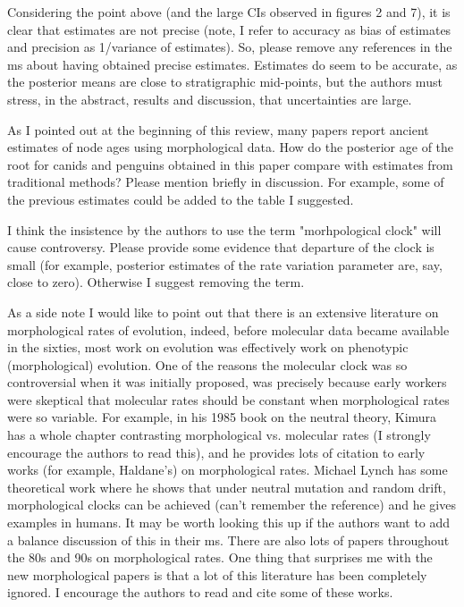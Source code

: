 \documentclass[11pt]{article}
\begin{document}
Considering the point above (and the large CIs observed in figures 2 and 7), it is clear that estimates are not precise (note, I refer to accuracy as bias of estimates and precision as 1/variance of estimates). So, please remove any references in the ms about having obtained precise estimates. Estimates do seem to be accurate, as the posterior means are close to stratigraphic mid-points, but the authors must stress, in the abstract, results and discussion, that uncertainties are large.

As I pointed out at the beginning of this review, many papers report ancient estimates of node ages using morphological data. How do the posterior age of the root for canids and penguins obtained in this paper compare with estimates from traditional methods? Please mention briefly in discussion. For example, some of the previous estimates could be added to the table I suggested.

I think the insistence by the authors to use the term "morhpological clock" will cause controversy. Please provide some evidence that departure of the clock is small (for example, posterior estimates of the rate variation parameter are, say, close to zero). Otherwise I suggest removing the term.

As a side note I would like to point out that there is an extensive literature on morphological rates of evolution, indeed, before molecular data became available in the sixties, most work on evolution was effectively work on phenotypic (morphological) evolution. One of the reasons the molecular clock was so controversial when it was initially proposed, was precisely because early workers were skeptical that molecular rates should be constant when morphological rates were so variable. For example, in his 1985 book on the neutral theory, Kimura has a whole chapter contrasting morphological vs. molecular rates (I strongly encourage the authors to read this), and he provides lots of citation to early works (for example, Haldane's) on morphological rates. Michael Lynch has some theoretical work where he shows that under neutral mutation and random drift, morphological clocks can be achieved (can't remember the reference) and he gives examples in humans. It may be worth looking this up if the authors want to add a balance discussion of this in their ms. There are also lots of papers throughout the 80s and 90s on morphological rates. One thing that surprises me with the new morphological papers is that a lot of this literature has been completely ignored. I encourage the authors to read and cite some of these works.
\end{document}
